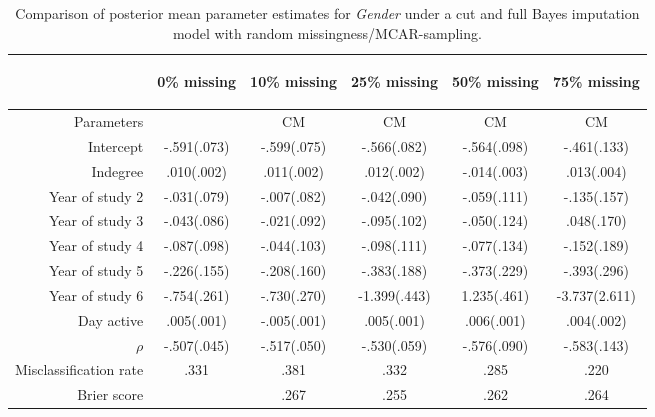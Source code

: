 \documentclass{article}
\begin{document}
\begin{sidewaystable}
	\caption{Comparison of posterior mean parameter estimates for \textit{Gender} under a cut and full Bayes imputation model with random missingness/MCAR-sampling.}
	\label{tab:compareGenderRandomF0}
	\begin{center}
		\bigskip
		\bigskip
		\bigskip
		
		\begin{tabular}{r|ccccc}
			&
			\begin{rotate}{60} 0\% missing \end{rotate} &
			\begin{rotate}{60} 10\% missing \end{rotate}&
			\begin{rotate}{60} 25\% missing \end{rotate}&
			\begin{rotate}{60} 50\% missing \end{rotate}&
			\begin{rotate}{60} 75\% missing \end{rotate} \\ \hline
			Parameters 	   & 		    & CM		 	& CM	  	& CM	 	 & CM  			\\ \hline
			Intercept 	   &-.591(.073)	&-.599(.075)&-.566(.082)	&-.564(.098)&-.461(.133)	\\
			Indegree       & .010(.002)	& .011(.002)& .012(.002)	&-.014(.003)& .013(.004)	\\
			Year of study 2&-.031(.079)	&-.007(.082)&-.042(.090)	&-.059(.111)&-.135(.157)	\\
			Year of study 3&-.043(.086)	&-.021(.092)&-.095(.102)	&-.050(.124)& .048(.170)	\\
			Year of study 4&-.087(.098)	&-.044(.103)&-.098(.111)	&-.077(.134)&-.152(.189)	\\
			Year of study 5&-.226(.155)	&-.208(.160)&-.383(.188)	&-.373(.229)&-.393(.296)	\\
			Year of study 6&-.754(.261)	&-.730(.270)&-1.399(.443) 	&1.235(.461)&-3.737(2.611)	\\
			Day active 	   & .005(.001)	&-.005(.001)& .005(.001) 	& .006(.001)& .004(.002)	\\
			$\rho$ 		   &-.507(.045)	&-.517(.050)&-.530(.059)	&-.576(.090)&-.583(.143)	\\
			Misclassification rate & .331		& .381  	& .332 	 		& .285	 	& .220	 	 	\\
			Brier score    &            & .267      & .255          & .262      & .264          \\ \hline
			

\end{tabular}
\end{center}
\end{sidewaystable}
\end{document}
